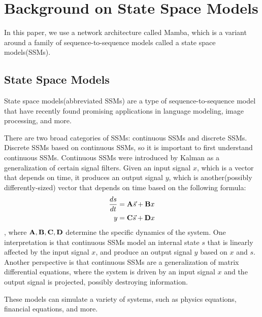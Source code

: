
\section{Background on State Space Models}
In this paper, we use a network architecture called Mamba, which is a variant
around a family of sequence-to-sequence models called a state space
models(SSMs).

\subsection{State Space Models}
State space models(abbreviated SSMs) are a type of sequence-to-sequence model
that have recently found promising applications in language
modeling\cite{mamba}, image processing\cite{medmamba}, and more\cite{s4}.

There are two broad categories of SSMs: continuous SSMs and discrete SSMs.
Discrete SSMs based on continuous SSMs, so it is important to first understand
continuous SSMs.
Continuous SSMs were introduced by Kalman\cite{kalman} as a generalization of
certain signal filters.
Given an input signal $x$, which is a vector that depends on time, it produces
an output signal $y$, which is another(possibly differently-sized) vector that
depends on time based on the following formula:
$$\begin{aligned}
    \frac{ds}{dt} &= {\mathbf{A}}\vec{s} + {\mathbf{B}} x \\
    y &= {\mathbf{C}}\vec{s} + {\mathbf{D}} x
\end{aligned}$$
, where ${\mathbf{A}}, {\mathbf{B}}, {\mathbf{C}}, {\mathbf{D}}$ determine the specific dynamics of the system.
One interpretation is that continuous SSMs model an internal state $s$ that is
linearly affected by the input signal $x$, and produce an output signal $y$
based on $x$ and $s$.
Another perspective is that continuous SSMs are a generalization of matrix
differential equations, where the system is driven by an input signal $x$ and
the output signal is projected, possibly destroying information.

These models can simulate a variety of systems, such as physics equations,
financial equations, and more.

